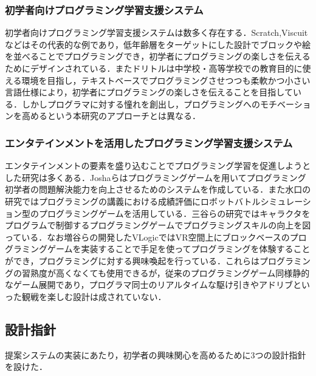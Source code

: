 \subsubsection{初学者向けプログラミング学習支援システム}
初学者向けプログラミング学習支援システムは数多く存在する．Scratch\cite{scratch},Viscuit\cite{viscuit}などはその代表的な例であり，低年齢層をターゲットにした設計でブロックや絵を並べることでプログラミングでき，初学者にプログラミングの楽しさを伝えるためにデザインされている．またドリトル\cite{dolittle}は中学校・高等学校での教育目的に使える環境を目指し，テキストベースでプログラミングさせつつも柔軟かつ小さい言語仕様により，初学者にプログラミングの楽しさを伝えることを目指している．しかしプログラマに対する憧れを創出し，プログラミングへのモチベーションを高めるという本研究のアプローチとは異なる．

\subsubsection{エンタテインメントを活用したプログラミング学習支援システム}
エンタテインメントの要素を盛り込むことでプログラミング学習を促進しようとした研究は多くある．Joshaらはプログラミングゲームを用いてプログラミング初学者の問題解決能力を向上させるためのシステムを作成している\cite{joshua}．また水口の研究ではプログラミングの講義における成績評価にロボットバトルシミュレーション型のプログラミングゲームを活用している\cite{minakuchi}．三谷らの研究ではキャラクタをプログラムで制御するプログラミングゲームでプログラミングスキルの向上を図っている\cite{mitani}．なお増谷らの開発したVLogic\cite{mashitani}ではVR空間上にブロックベースのプログラミングゲームを実装することで手足を使ってプログラミングを体験することができ，プログラミングに対する興味喚起を行っている．これらはプログラミングの習熟度が高くなくても使用できるが，従来のプログラミングゲーム同様静的なゲーム展開であり，プログラマ同士のリアルタイムな駆け引きやアドリブといった観戦を楽しむ設計は成されていない．



\subsection{設計指針}

提案システムの実装にあたり，初学者の興味関心を高めるために3つの設計指針を設けた．

